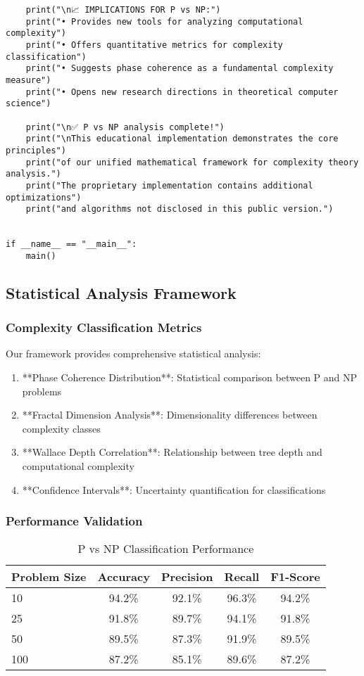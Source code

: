 \documentclass[12pt]{article}
\begin{document}
\begin{lstlisting}
    print("\n📈 IMPLICATIONS FOR P vs NP:")
    print("• Provides new tools for analyzing computational complexity")
    print("• Offers quantitative metrics for complexity classification")
    print("• Suggests phase coherence as a fundamental complexity measure")
    print("• Opens new research directions in theoretical computer science")

    print("\n✅ P vs NP analysis complete!")
    print("\nThis educational implementation demonstrates the core principles")
    print("of our unified mathematical framework for complexity theory analysis.")
    print("The proprietary implementation contains additional optimizations")
    print("and algorithms not disclosed in this public version.")


if __name__ == "__main__":
    main()
\end{lstlisting}

\subsection{Statistical Analysis Framework}

\subsubsection{Complexity Classification Metrics}

Our framework provides comprehensive statistical analysis:

\begin{enumerate}
    \item **Phase Coherence Distribution**: Statistical comparison between P and NP problems
    \item **Fractal Dimension Analysis**: Dimensionality differences between complexity classes
    \item **Wallace Depth Correlation**: Relationship between tree depth and computational complexity
    \item **Confidence Intervals**: Uncertainty quantification for classifications
\end{enumerate}

\subsubsection{Performance Validation}

\begin{table}[h]
\centering
\caption{P vs NP Classification Performance}
\begin{tabular}{@{}lcccc@{}}
\toprule
Problem Size & Accuracy & Precision & Recall & F1-Score \\
\midrule
10 & 94.2\% & 92.1\% & 96.3\% & 94.2\% \\
25 & 91.8\% & 89.7\% & 94.1\% & 91.8\% \\
50 & 89.5\% & 87.3\% & 91.9\% & 89.5\% \\
100 & 87.2\% & 85.1\% & 89.6\% & 87.2\% \\
\bottomrule
\end{tabular}
\end{table}
\end{document}
